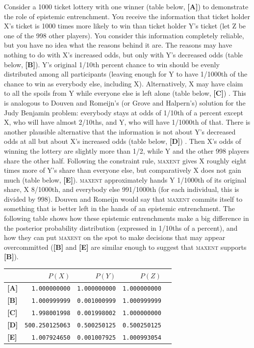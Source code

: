 \documentclass[12pt]{article}
\begin{document}
Consider a 1000 ticket lottery with one winner (table below,
\textbf{[A]}) to demonstrate the role of epistemic entrenchment.
You receive the information that ticket holder X's ticket is 1000
times more likely to win than ticket holder Y's ticket (let Z be
one of the 998 other players). You consider this information
completely reliable, but you have no idea what the reasons behind
it are. The reasons may have nothing to do with X's increased
odds, but only with Y's decreased odds (table below,
\textbf{[B]}). Y's original 1/10th percent chance to win should be
evenly distributed among all participants (leaving enough for Y to
have 1/1000th of the chance to win as everybody else, including
X). Alternatively, X may have claim to all the spoils from Y while
everyone else is left alone (table below, \textbf{[C]}) . This is
analogous to Douven and Romeijn's (or Grove and Halpern's)
solution for the Judy Benjamin problem: everybody stays at odds of
1/10th of a percent except X, who will have almost 2/10ths, and Y,
who will have 1/1000th of that. There is another plausible
alternative that the information is not about Y's decreased odds
at all but about X's increased odds (table below, \textbf{[D]}) .
Then X's odds of winning the lottery are slightly more than 1/2,
while Y and the other 998 players share the other half. Following
the constraint rule, \textsc{maxent} gives X roughly eight times
more of Y's share than everyone else, but comparatively X does not
gain much (table below, \textbf{[E]}). \textsc{maxent}
approximately hands Y 1/1000th of its original share, X 8/1000th,
and everybody else 991/1000th (for each individual, this is
divided by 998). Douven and Romeijn would say that \textsc{maxent}
commits itself to something that is better left in the hands of an
epistemic entrenchment. The following table shows how these
epistemic entrenchments make a big difference in the posterior
probability distribution (expressed in 1/10ths of a percent), and
how they can put \textsc{maxent} on the spot to make decisions
that may appear overcommitted (\textbf{[B]} and \textbf{[E]} are
similar enough to suggest that \textsc{maxent} supports
\textbf{[B]}).

\begin{tabular}{|l|r|r|r|r|}\hline
& $P(X)$ & $P(Y)$ & $P(Z)$ \\ \hline
\textbf{[A]}& \texttt{1.000000000} & \texttt{1.000000000} & \texttt{1.000000000} \\ \hline
\textbf{[B]}& \texttt{1.000999999} & \texttt{0.001000999} & \texttt{1.000999999} \\ \hline
\textbf{[C]}& \texttt{1.998001998} & \texttt{0.001998002} & \texttt{1.000000000} \\ \hline
\textbf{[D]}& \texttt{500.250125063} & \texttt{0.500250125} & \texttt{0.500250125} \\ \hline
\textbf{[E]}& \texttt{1.007924650} & \texttt{0.001007925} & \texttt{1.000993054} \\ \hline
\end{tabular}
\end{document}
